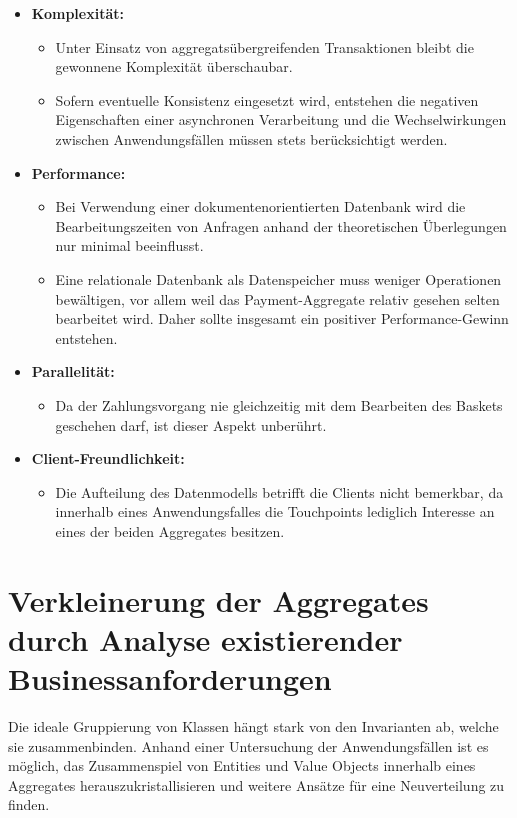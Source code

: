 \begin{itemize}[noitemsep,nolistsep,topsep=-2pt]
	\item \textbf{Komplexität: } {
		\begin{itemize}
			\item {Unter Einsatz von aggregatsübergreifenden Transaktionen bleibt die gewonnene Komplexität überschaubar.}
			\item {Sofern eventuelle Konsistenz eingesetzt wird, entstehen die negativen Eigenschaften einer asynchronen Verarbeitung und die Wechselwirkungen zwischen Anwendungsfällen müssen stets berücksichtigt werden.}
		\end{itemize}
	}
	\item \textbf{Performance: } {
		\begin{itemize}
			\item Bei Verwendung einer dokumentenorientierten Datenbank wird die Bearbeitungszeiten von Anfragen anhand der theoretischen Überlegungen nur minimal beeinflusst.
			\item Eine relationale Datenbank als Datenspeicher muss weniger Operationen bewältigen, vor allem weil das Payment-Aggregate relativ gesehen selten bearbeitet wird. Daher sollte insgesamt ein positiver Performance-Gewinn entstehen. 
		\end{itemize}
	}
	\item \textbf{Parallelität: } {
		\begin{itemize}
			\item Da der Zahlungsvorgang nie gleichzeitig mit dem Bearbeiten des Baskets geschehen darf, ist dieser Aspekt unberührt. 
		\end{itemize}	
	}
	\item \textbf{Client-Freundlichkeit: } {
		\begin{itemize}
			\item Die Aufteilung des Datenmodells betrifft die Clients nicht bemerkbar, da innerhalb eines Anwendungsfalles die Touchpoints lediglich Interesse an eines der beiden Aggregates besitzen.
		\end{itemize}
	}
\end{itemize}


\section{Verkleinerung der Aggregates durch Analyse existierender Businessanforderungen}

Die ideale Gruppierung von Klassen hängt stark von den Invarianten ab, welche sie zusammenbinden. Anhand einer Untersuchung der Anwendungsfällen ist es möglich, das Zusammenspiel von Entities und Value Objects innerhalb eines Aggregates herauszukristallisieren und weitere Ansätze für eine Neuverteilung zu finden.

